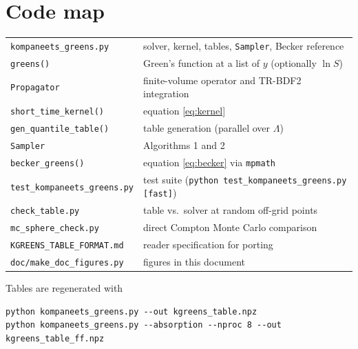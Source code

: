 \documentclass[11pt]{article}
\begin{document}
\appendix
\section{Code map}

\begin{tabular}{ll}
\texttt{kompaneets\_greens.py} & solver, kernel, tables, \texttt{Sampler}, Becker reference\\
\quad \texttt{greens()} & Green's function at a list of $y$ (optionally $\ln S$)\\
\quad \texttt{Propagator} & finite-volume operator and TR-BDF2 integration\\
\quad \texttt{short\_time\_kernel()} & equation \eqref{eq:kernel}\\
\quad \texttt{gen\_quantile\_table()} & table generation (parallel over $\Lambda$)\\
\quad \texttt{Sampler} & Algorithms 1 and 2\\
\quad \texttt{becker\_greens()} & equation \eqref{eq:becker} via \texttt{mpmath}\\
\texttt{test\_kompaneets\_greens.py} & test suite (\texttt{python test\_kompaneets\_greens.py [fast]})\\
\texttt{check\_table.py} & table vs.\ solver at random off-grid points\\
\texttt{mc\_sphere\_check.py} & direct Compton Monte Carlo comparison\\
\texttt{KGREENS\_TABLE\_FORMAT.md} & reader specification for porting\\
\texttt{doc/make\_doc\_figures.py} & figures in this document\\
\end{tabular}

\medskip
Tables are regenerated with
\begin{verbatim}
python kompaneets_greens.py --out kgreens_table.npz
python kompaneets_greens.py --absorption --nproc 8 --out kgreens_table_ff.npz
\end{verbatim}
\end{document}
